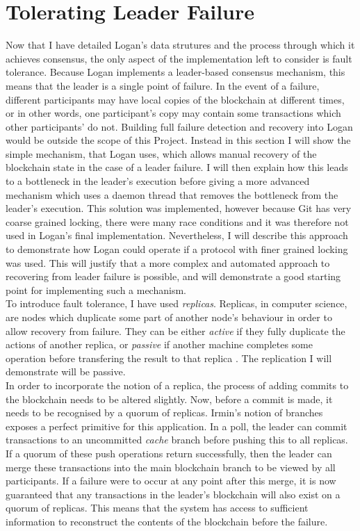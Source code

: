 \documentclass[12pt,a4paper,twoside,openright]{report}
\begin{document}
	\section{Tolerating Leader Failure}\label{sec:faulttol}
	Now that I have detailed Logan's data strutures and the process through which it achieves consensus, the only aspect of the implementation left to consider is fault tolerance.
	Because Logan implements a leader-based consensus mechanism, this means that the leader is a single point of failure.
	In the event of a failure, different participants may have local copies of the blockchain at different times, or in other words, one participant's copy may contain some transactions which other participants' do not.
	Building full failure detection and recovery into Logan would be outside the scope of this Project. 
	Instead in this section I will show the simple mechanism, that Logan uses, which allows manual recovery of the blockchain state in the case of a leader failure. 
	I will then explain how this leads to a bottleneck in the leader's execution before giving a more advanced mechanism which uses a daemon thread that removes the bottleneck from the leader's execution. 
	This solution was implemented, however because Git has very coarse grained locking, there were many race conditions and it was therefore not used in Logan's final implementation. 
	Nevertheless, I will describe this approach to demonstrate how Logan could operate if a protocol with finer grained locking was used. 
	This will justify that a more complex and automated approach to recovering from leader failure is possible, and will demonstrate a good starting point for implementing such a mechanism. \\

	To introduce fault tolerance, I have used \textit{replicas}. 
	Replicas, in computer science, are nodes which duplicate some part of another node's behaviour in order to allow recovery from failure. 
	They can be either \textit{active} if they fully duplicate the actions of another replica, or \textit{passive} if another machine completes some operation before transfering the result to that replica \parencite{Replication}.
	The replication I will demonstrate will be passive.\\

	In order to incorporate the notion of a replica, the process of adding commits to the blockchain needs to be altered slightly.
	Now, before a commit is made, it needs to be recognised by a quorum of replicas.
	Irmin's notion of branches exposes a perfect primitive for this application.
	In a poll, the leader can commit transactions to an uncommitted \textit{cache} branch before pushing this to all replicas.
	If a quorum of these push operations return successfully, then the leader can merge these transactions into the main blockchain branch to be viewed by all participants.
	If a failure were to occur at any point after this merge, it is now guaranteed that any transactions in the leader's blockchain will also exist on a quorum of replicas.
	This means that the system has access to sufficient information to reconstruct the contents of the blockchain before the failure.\\
\end{document}
